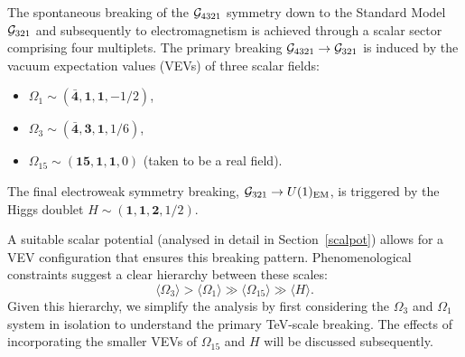 The spontaneous breaking of the $\mathcal{G}_{\rm 4321}$ symmetry down to the Standard Model $\mathcal{G}_{\rm 321}$ and subsequently to electromagnetism is achieved through a scalar sector comprising four multiplets. The primary breaking $\mathcal{G}_{\rm 4321} \to \mathcal{G}_{\rm 321}$ is induced by the vacuum expectation values (VEVs) of three scalar fields:
\begin{itemize}
    \item $\Omega_1 \sim \left( \mathbf{\bar 4}, \mathbf{1}, \mathbf{1}, -1/2 \right)$,
    \item $\Omega_3 \sim \left( \mathbf{\bar 4}, \mathbf{3}, \mathbf{1}, 1/6 \right)$,
    \item $\Omega_{15} \sim \left( \mathbf{15}, \mathbf{1}, \mathbf{1}, 0 \right)$ (taken to be a real field).
\end{itemize}
The final electroweak symmetry breaking, $\mathcal{G}_{\rm 321} \to U(1)_{\rm EM}$, is triggered by the Higgs doublet $H \sim (\mathbf{1},\mathbf{1},\mathbf{2},1/2)$.

A suitable scalar potential (analysed in detail in Section~\ref{scalpot}) allows for a VEV configuration that ensures this breaking pattern. Phenomenological constraints suggest a clear hierarchy between these scales:
\begin{equation}
    \langle \Omega_{3} \rangle > \langle \Omega_{1} \rangle \gg \langle \Omega_{15} \rangle \gg \langle H \rangle.
\end{equation}
Given this hierarchy, we simplify the analysis by first considering the $\Omega_{3}$ and $\Omega_{1}$ system in isolation to understand the primary TeV-scale breaking. The effects of incorporating the smaller VEVs of $\Omega_{15}$ and $H$ will be discussed subsequently.

